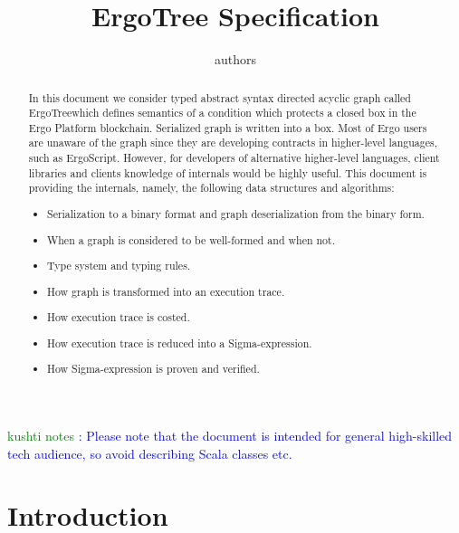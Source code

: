 \documentclass[11pt]{article}
\newcommand{\authnote}[2]{\textsf{#1 \textcolor{blue}{: #2}}}
\newcommand{\knote}[1]{{\authnote{\textcolor{green}{kushti notes}}{#1}}}
\newcommand{\asdag}{ErgoTree}
\begin{document}
\title{ErgoTree Specification}

\author{authors}


\maketitle

\begin{abstract}
In this document we consider typed abstract syntax directed acyclic graph
called \asdag which defines semantics of a condition which protects a closed
box in the Ergo Platform blockchain. Serialized graph is written into a box.
Most of Ergo users are unaware of the graph since they are developing contracts in higher-level languages, such as
ErgoScript. However, for developers of alternative higher-level languages, client libraries and clients knowledge of
internals would be highly useful. This document is providing the internals, namely, the following data structures and
algorithms:
\begin{itemize}
\item{} Serialization to a binary format and graph deserialization from the binary form.
\item{} When a graph is considered to be well-formed and when not.
\item{} Type system and typing rules.
\item{} How graph is transformed into an execution trace.
\item{} How execution trace is costed.
\item{} How execution trace is reduced into a Sigma-expression.
\item{} How Sigma-expression is proven and verified.
\end{itemize}
\end{abstract}

\knote{Please note that the document is intended for general high-skilled tech audience, so avoid describing Scala
classes etc.}

\section{Introduction}
\label{sec:intro}

















\appendix



\end{document}
